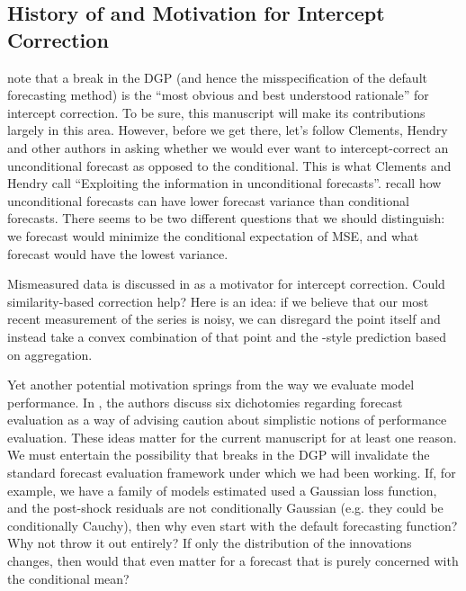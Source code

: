 \documentclass[11pt]{article}
\theoremstyle{definition}
\begin{document}
\subsection{History of and Motivation for Intercept Correction\label{intercept_correction}}

  \cite[p. 177]{hendry1994theory} note that a break in the DGP (and hence the misspecification of the default forecasting method) is the ``most obvious and best understood rationale'' for intercept correction.  To be sure, this manuscript will make its contributions largely in this area.  However, before we get there, let's follow Clements, Hendry and other authors in asking whether we would ever want to intercept-correct an unconditional forecast as opposed to the conditional.  This is what Clements and Hendry call ``Exploiting the information in unconditional forecasts''.  \cite[p. 170-1]{hendry1994theory} recall how unconditional forecasts can have lower forecast variance than conditional forecasts.  There seems to be two different questions that we should distinguish: we forecast would minimize the conditional expectation of MSE, and what forecast would have the lowest variance.

  Mismeasured data is discussed in \cite[p. 166]{hendry1994theory} as a motivator for intercept correction.  Could similarity-based correction help?  Here is an idea: if we believe that our most recent measurement of the series is noisy, we can disregard the point itself and instead take a convex combination of that point and the \cite{lin2021minimizing}-style prediction based on aggregation.

 Yet another potential motivation springs from the way we evaluate model performance.  In \cite{clements2005evaluating}, the authors discuss six dichotomies regarding forecast evaluation as a way of advising caution about simplistic notions of performance evaluation.  These ideas matter for the current manuscript for at least one reason.  We must entertain the possibility that breaks in the DGP will invalidate the standard forecast evaluation framework under which we had been working.  If, for example, we have a family of models estimated used a Gaussian loss function, and the post-shock residuals are not conditionally Gaussian (e.g. they could be conditionally Cauchy), then why even start with the default forecasting function?  Why not throw it out entirely?  If only the distribution of the innovations changes, then would that even matter for a forecast that is purely concerned with the conditional mean?
\end{document}
